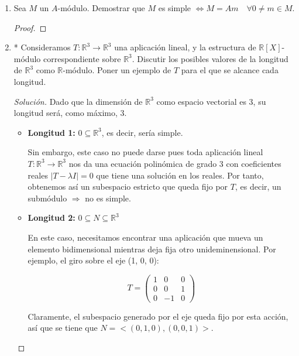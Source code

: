 \documentclass[paper=a4, fontsize=11pt, spanish]{scrartcl}
\begin{document}
\begin{enumerate}
\begin{proof}[Solución]
			Por lo que, finalmente, hemos demostrado que $Z(M_n(K)) = \{kI_n: k \in K\}$.
		\end{proof}
		
		\item Sea $M$ un $A$-módulo. Demostrar que $M$ es simple $\Leftrightarrow M = Am \quad \forall 0 \neq m
		\in M$.
		\begin{proof}
			\fbox{$\Leftarrow$}
		\end{proof}
		
		\item * Consideramos $T: \mathbb{R}^3 \rightarrow \mathbb{R}^3$ una aplicación lineal, y la estructura
		de $\mathbb{R}[X]$-módulo correspondiente sobre $\mathbb{R}^3$. Discutir los posibles valores de la
		longitud de $\mathbb{R}^3$ como $\mathbb{R}$-módulo. Poner un ejemplo de $T$ para el que se alcance
		cada longitud.
		\begin{proof}[Solución]
			Dado que la dimensión de $\mathbb{R}^3$ como espacio vectorial es 3, su longitud será, como máximo, 3.
			
			\begin{itemize}
				\item \textbf{Longitud 1:} $0 \subseteq \mathbb{R}^3$, es decir, sería simple.
				
				Sin embargo, este caso no puede darse pues toda aplicación lineal $T: \mathbb{R}^3 \rightarrow
				\mathbb{R}^3$ nos da una ecuación polinómica de grado 3 con coeficientes reales $|T - \lambda I|
				= 0$ que tiene una solución en los reales. Por tanto, obtenemos así un subespacio estricto que
				queda fijo por $T$, es decir, un submódulo $\Rightarrow$ no es simple.
				
				\item \textbf{Longitud 2:} $0 \subseteq N \subseteq \mathbb{R}^3$
				
				En este caso, necesitamos encontrar una aplicación que mueva un elemento bidimensional mientras
				deja fija otro unideminensional. Por ejemplo, el giro sobre el eje (1, 0, 0):
				
				$$T = \begin{pmatrix}
					1 & 0 & 0 \\
					0 & 0 & 1 \\
					0 & -1 & 0
				\end{pmatrix}$$
				
				Claramente, el subespacio generado por el eje queda fijo por esta acción, así que se tiene que
				$N = <(0, 1, 0), (0, 0, 1)>$.
				

\end{itemize}
\end{proof}
\end{enumerate}
\end{document}
